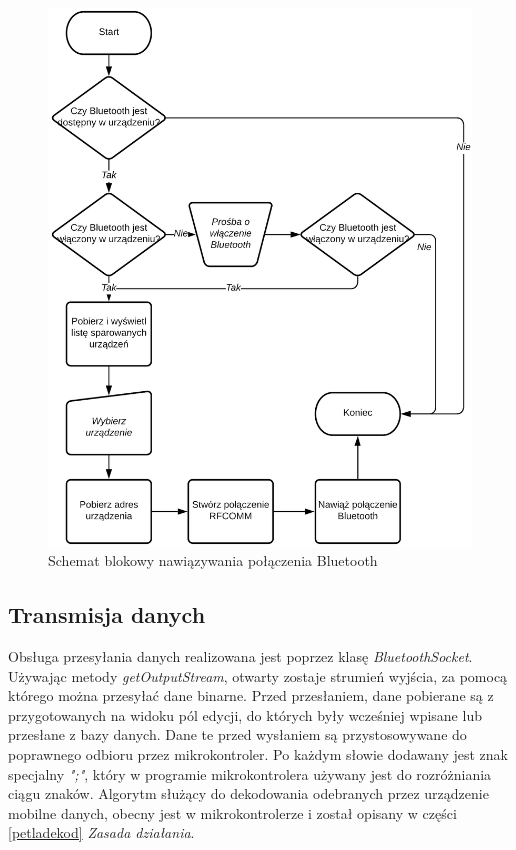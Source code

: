 \documentclass[a4paper,12pt, twoside]{article}
\begin{document}
    	\begin{figure}[H]
    	        \centering
    			\includegraphics[width=12cm]{images/rys_12bluetoothconnection.png}
    			\caption{Schemat blokowy nawiązywania połączenia Bluetooth}
                \label{fig:btconnect}
    	\end{figure}
    	
    	\subsection{Transmisja danych}
    	Obsługa przesyłania danych realizowana jest poprzez klasę \textit{BluetoothSocket}. Używając metody \textit{getOutputStream}\cite{outputstream}, otwarty zostaje strumień wyjścia, za pomocą którego można przesyłać dane binarne. Przed przesłaniem, dane pobierane są z przygotowanych na widoku pól edycji, do których były wcześniej wpisane lub przesłane z bazy danych. Dane te przed wysłaniem są przystosowywane do poprawnego odbioru przez mikrokontroler. Po każdym słowie dodawany jest znak specjalny \textit{";"}, który w programie mikrokontrolera używany jest do rozróżniania ciągu znaków. Algorytm służący do dekodowania odebranych przez urządzenie mobilne danych, obecny jest w mikrokontrolerze i został opisany w części \ref{petladekod} \textit{Zasada działania}.
    	
\end{document}
